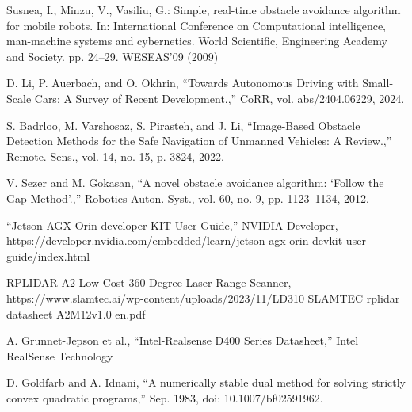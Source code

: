 \documentclass[conference]{IEEEtran}
\begin{document}
\begin{thebibliography}{00}


 Susnea, I., Minzu, V., Vasiliu, G.: Simple, real-time obstacle avoidance algorithm for mobile robots. In: International Conference on Computational
intelligence, man-machine systems and cybernetics. World Scientific, Engineering Academy and Society. pp. 24–29. WESEAS’09 (2009)

 D. Li, P. Auerbach, and O. Okhrin, “Towards Autonomous Driving with Small-Scale Cars: A Survey of Recent Development.,” CoRR, vol. abs/2404.06229, 2024.


 S. Badrloo, M. Varshosaz, S. Pirasteh, and J. Li, “Image-Based Obstacle Detection Methods for the Safe Navigation of Unmanned Vehicles: A Review.,” Remote. Sens., vol. 14, no. 15, p. 3824, 2022.

 V. Sezer and M. Gokasan, “A novel obstacle avoidance algorithm: ‘Follow the Gap Method’.,” Robotics Auton. Syst., vol. 60, no. 9, pp. 1123–1134, 2012.

 “Jetson AGX Orin developer KIT User Guide,” NVIDIA Developer, https://developer.nvidia.com/embedded/learn/jetson-agx-orin-devkit-user-guide/index.html 


 RPLIDAR A2 Low Cost 360 Degree Laser Range Scanner, https://www.slamtec.ai/wp-content/uploads/2023/11/LD310 \textunderscore SLAMTEC \textunderscore rplidar \textunderscore datasheet \textunderscore A2M12\textunderscore v1.0 \textunderscore en.pdf 


 A. Grunnet-Jepson et al., “Intel-Realsense D400 Series Datasheet,” Intel RealSense Technology



 D. Goldfarb and A. Idnani, “A numerically stable dual method for solving strictly convex quadratic programs,” Sep. 1983, doi: 10.1007/bf02591962.



\end{thebibliography}
\vspace{12pt}
\color{red}
\end{document}

